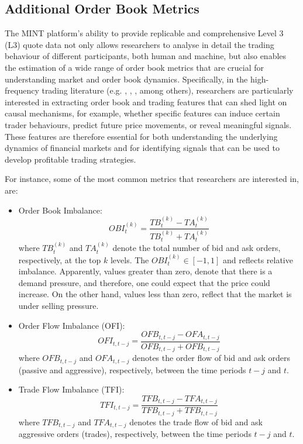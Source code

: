 \subsection{Additional Order Book Metrics}
The MINT platform’s ability to provide replicable and comprehensive Level 3 (L3) quote data not only allows researchers to analyse in detail the trading behaviour of different participants, both human and machine, but also enables the estimation of a wide range of order book metrics that are crucial for understanding market and order book dynamics. Specifically, in the high-frequency trading literature (e.g. \cite{cont2014price}, \cite{ait2022}, \cite{cordoni2024consistent}, \cite{jonuzaj2025} among others), researchers are particularly interested in extracting order book and trading features that can shed light on causal mechanisms, for example, whether specific features can induce certain trader behaviours, predict future price movements, or reveal meaningful signals. These features are therefore essential for both understanding the underlying dynamics of financial markets and for identifying signals that can be used to develop profitable trading strategies.

For instance, some of the most common metrics that researchers are interested in, are:
\begin{itemize}
	\item Order Book Imbalance: 
	\begin{equation*}
	OBI^{(k)}_{t} = \frac{TB^{(k)}_{t} - TA^{(k)}_{t}}{TB^{(k)}_{t}+TA^{(k)}_{t}}
	\end{equation*}
	where $TB^{(k)}_{t}$ and  $TA^{(k)}_{t}$ denote the total number of bid and ask orders, respectively, at the top 	$k$ levels. The $OBI^{(k)}_{t} \in [-1,1]$ and reflects relative imbalance. Apparently, values greater than zero, 	denote that there is a demand pressure, and therefore, one could expect that the price could increase. On the 	other hand, values less than zero, reflect that the market is under selling pressure.
	\item Order Flow Imbalance (OFI):
	\begin{equation*}
	OFI_{t,t-j} = \frac{OFB_{t,t-j} - OFA_{t,t-j}}{OFB_{t,t-j}+OFB_{t,t-j}}
	\end{equation*}
	where $OFB_{t,t-j}$ and $OFA_{t,t-j}$  denotes the order flow of bid and ask orders (passive and aggressive), respectively, between the time periods $t-j$ and $t$.
	\item Trade Flow Imbalance (TFI):
        \begin{equation*}
	TFI_{t,t-j} = \frac{TFB_{t,t-j} - TFA_{t,t-j}}{TFB_{t,t-j}+TFB_{t,t-j}}
	\end{equation*}
        where $TFB_{t,t-j}$ and $TFA_{t,t-j}$  denotes the trade flow of bid and ask aggressive orders (trades), respectively, between the time periods $t-j$ and $t$.

\end{itemize}

